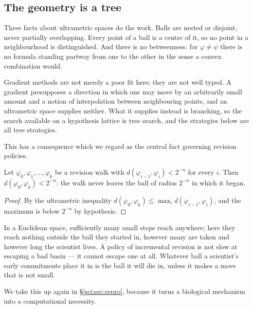 \subsection{The geometry is a tree}\label{sci:S6.1}

Three facts about ultrametric spaces do the work. Balls are nested or disjoint, never partially
overlapping. Every point of a ball is a centre of it, so no point in a neighbourhood is distinguished.
And there is no betweenness: for $\varphi \ne \psi$ there is no formula standing partway from one to
the other in the sense a convex combination would.

\begin{remark}
\label{sci:rem:nogradient}
Gradient methods are not merely a poor fit here; they are not well typed. A gradient presupposes a
direction in which one may move by an arbitrarily small amount and a notion of interpolation between
neighbouring points, and an ultrametric space supplies neither. What it supplies instead is branching,
so the search available on a hypothesis lattice is tree search, and the strategies below are all tree
strategies.
\end{remark}

This has a consequence which we regard as the central fact governing revision policies.

\begin{proposition}[Confinement]
\label{sci:prop:confinement}
Let $\varphi_0, \varphi_1, \ldots, \varphi_k$ be a revision walk with
$d(\varphi_{i-1}, \varphi_i) < 2^{-n}$ for every $i$. Then $d(\varphi_0, \varphi_k) < 2^{-n}$: the
walk never leaves the ball of radius $2^{-n}$ in which it began.
\end{proposition}

\begin{proof}
By the ultrametric inequality $d(\varphi_0, \varphi_k) \le \max_i d(\varphi_{i-1}, \varphi_i)$, and
the maximum is below $2^{-n}$ by hypothesis.
\end{proof}

In a Euclidean space, sufficiently many small steps reach anywhere; here they reach nothing outside the
ball they started in, however many are taken and however long the scientist lives. A policy of
incremental revision is not slow at escaping a bad basin --- it cannot escape one at all. Whatever ball
a scientist's early commitments place it in is the ball it will die in, unless it makes a move that is
not small.

We take this up again in \S\ref{sci:sec:repro}, because it turns a biological mechanism into a
computational necessity.

